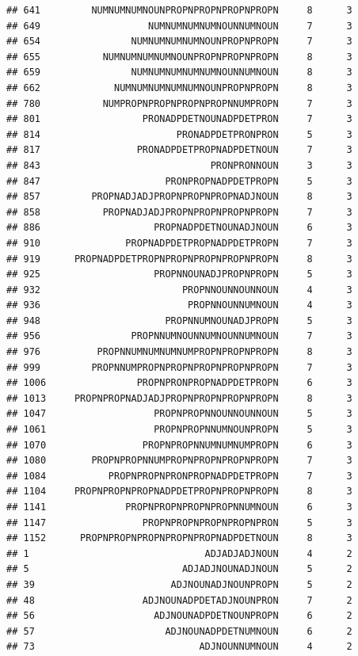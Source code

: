 \documentclass[]{article}
\begin{document}
\begin{verbatim}
## 641         NUMNUMNUMNOUNPROPNPROPNPROPNPROPN     8      3
## 649                   NUMNUMNUMNUMNOUNNUMNOUN     7      3
## 654                NUMNUMNUMNUMNOUNPROPNPROPN     7      3
## 655           NUMNUMNUMNUMNOUNPROPNPROPNPROPN     8      3
## 659                NUMNUMNUMNUMNUMNOUNNUMNOUN     8      3
## 662             NUMNUMNUMNUMNUMNOUNPROPNPROPN     8      3
## 780           NUMPROPNPROPNPROPNPROPNNUMPROPN     7      3
## 801                  PRONADPDETNOUNADPDETPRON     7      3
## 814                        PRONADPDETPRONPRON     5      3
## 817                 PRONADPDETPROPNADPDETNOUN     7      3
## 843                              PRONPRONNOUN     3      3
## 847                      PRONPROPNADPDETPROPN     5      3
## 857         PROPNADJADJPROPNPROPNPROPNADJNOUN     8      3
## 858           PROPNADJADJPROPNPROPNPROPNPROPN     7      3
## 886                    PROPNADPDETNOUNADJNOUN     6      3
## 910               PROPNADPDETPROPNADPDETPROPN     7      3
## 919      PROPNADPDETPROPNPROPNPROPNPROPNPROPN     8      3
## 925                    PROPNNOUNADJPROPNPROPN     5      3
## 932                         PROPNNOUNNOUNNOUN     4      3
## 936                          PROPNNOUNNUMNOUN     4      3
## 948                      PROPNNUMNOUNADJPROPN     5      3
## 956                PROPNNUMNOUNNUMNOUNNUMNOUN     7      3
## 976          PROPNNUMNUMNUMNUMPROPNPROPNPROPN     8      3
## 999         PROPNNUMPROPNPROPNPROPNPROPNPROPN     7      3
## 1006                PROPNPRONPROPNADPDETPROPN     6      3
## 1013     PROPNPROPNADJADJPROPNPROPNPROPNPROPN     8      3
## 1047                   PROPNPROPNNOUNNOUNNOUN     5      3
## 1061                   PROPNPROPNNUMNOUNPROPN     5      3
## 1070                 PROPNPROPNNUMNUMNUMPROPN     6      3
## 1080        PROPNPROPNNUMPROPNPROPNPROPNPROPN     7      3
## 1084           PROPNPROPNPRONPROPNADPDETPROPN     7      3
## 1104     PROPNPROPNPROPNADPDETPROPNPROPNPROPN     8      3
## 1141              PROPNPROPNPROPNPROPNNUMNOUN     6      3
## 1147                 PROPNPROPNPROPNPROPNPRON     5      3
## 1152      PROPNPROPNPROPNPROPNPROPNADPDETNOUN     8      3
## 1                               ADJADJADJNOUN     4      2
## 5                           ADJADJNOUNADJNOUN     5      2
## 39                        ADJNOUNADJNOUNPROPN     5      2
## 48                   ADJNOUNADPDETADJNOUNPRON     7      2
## 56                     ADJNOUNADPDETNOUNPROPN     6      2
## 57                       ADJNOUNADPDETNUMNOUN     6      2
## 73                             ADJNOUNNUMNOUN     4      2

\end{verbatim}
\end{document}
